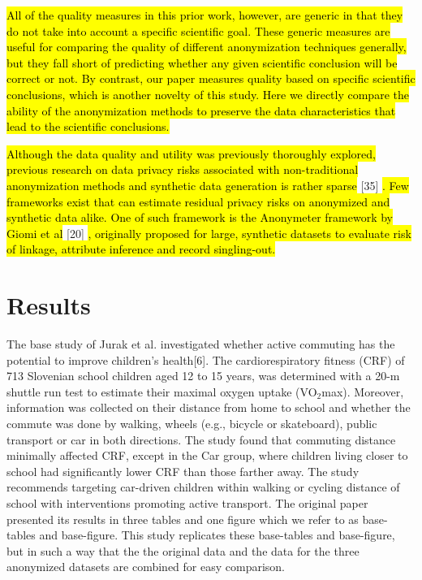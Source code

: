\documentclass[10pt]{article}
\newcommand{\mycite}[1]{[#1]}
\begin{document}
\hl{All of the quality measures in this prior work, however, are generic in that they do not take into account a specific scientific goal. These generic measures are useful for comparing the quality of different anonymization techniques generally, but they fall short of predicting whether any given scientific conclusion will be correct or not. By contrast, our paper measures quality based on specific scientific conclusions, which is another novelty of this study. Here we directly compare the ability of the anonymization methods to preserve the data characteristics that lead to the scientific conclusions.}

\hl{Although the data quality and utility was previously thoroughly explored, previous research on data privacy risks associated with non-traditional anonymization methods and synthetic data generation is rather sparse} \mycite{35} \hl{. Few frameworks exist that can estimate residual privacy risks on anonymized and synthetic data alike. One of such framework is the Anonymeter framework by Giomi et al} \mycite{20} \hl{, originally proposed for large, synthetic datasets to evaluate risk of linkage, attribute inference and record singling-out.}
  

\section*{Results}

The base study of Jurak et al. investigated whether active commuting has the potential to improve children’s health\mycite{6}. The cardiorespiratory fitness (CRF) of 713 Slovenian school children aged 12 to 15 years, was determined with a 20-m shuttle run test to estimate their maximal oxygen uptake (VO$_2$max). Moreover, information was collected on their distance from home to school and whether the commute was done by walking, wheels (e.g., bicycle or skateboard), public transport or car in both directions. The study found that commuting distance minimally affected CRF, except in the Car group, where children living closer to school had significantly lower CRF than those farther away. The study recommends targeting car-driven children within walking or cycling distance of school with interventions promoting active transport. The original paper presented its results in three tables and one figure which we refer to as base-tables and base-figure. This study replicates these base-tables and base-figure, but in such a way that the the original data and the data for the three anonymized datasets are combined for easy comparison.
\end{document}
